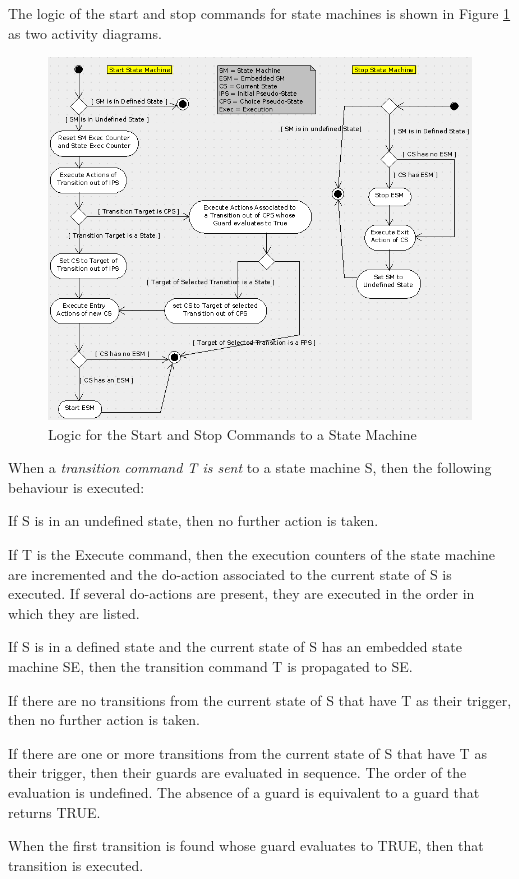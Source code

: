 \documentclass[a4paper,10pt]{article}
\newenvironment{fw_enumerate}					%
{\begin{enumerate}
  \setlength{\itemsep}{1mm}
  \setlength{\parskip}{0pt}
  \setlength{\parsep}{0pt}}
{\end{enumerate}}
\begin{document}
The logic of the start and stop commands for state machines is shown in Figure \ref{fig:SmStartStop} as two
activity diagrams.

\begin{figure}[ht]
 \centering
 \includegraphics[scale=0.45,keepaspectratio=true]{../images/SM_StartStop.png}
 \caption{Logic for the Start and Stop Commands to a State Machine}
 \label{fig:SmStartStop}
\end{figure}

When a \emph{transition command T is sent} to a state machine S, then the following behaviour is
executed:

\begin{fw_enumerate}
\item If S is in an undefined state, then no further action is taken.
\item If T is the Execute command, then the execution counters of the state machine are
incremented and the do-action associated to the current state of S is
executed. If several do-actions are present, they are executed in the order in which
they are listed.
\item If S is in a defined state and the current state of S has an embedded state machine SE,
then the transition command T is propagated to SE.
\item If there are no transitions from the current state of S that have T as their trigger, then
no further action is taken.
\item If there are one or more transitions from the current state of S that have T as their
trigger, then their guards are evaluated in sequence. The order of the evaluation is
undefined. The absence of a guard is equivalent to a guard that returns TRUE.
\item When the first transition is found whose guard evaluates to TRUE, then that transition
is executed.
\end{fw_enumerate}
\end{document}
